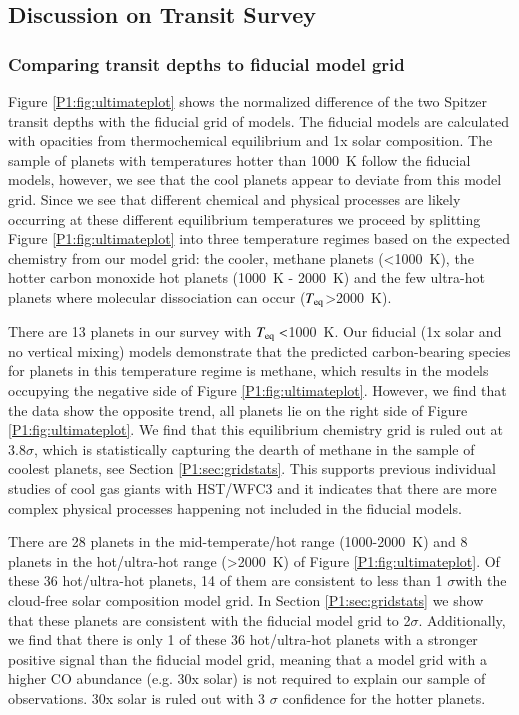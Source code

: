 \subsection{Discussion on Transit Survey}
\subsubsection{Comparing transit depths to fiducial model grid}

Figure \ref{P1:fig:ultimateplot} shows the normalized difference of the two Spitzer transit depths with the fiducial grid of models. The fiducial models are calculated with opacities from thermochemical equilibrium and 1x solar composition. The sample of planets with temperatures hotter than 1000~K follow the fiducial models, however, we see that the cool planets appear to deviate from this model grid. Since we see that different chemical and physical processes are likely occurring at these different equilibrium temperatures we proceed by splitting Figure \ref{P1:fig:ultimateplot} into three temperature regimes based on the expected chemistry from our model grid: the cooler, methane planets (<1000~K), the hotter carbon monoxide hot planets (1000~K - 2000~K) and the few ultra-hot planets where molecular dissociation can occur ($T_{\rm eq}$>2000~K).

There are 13 planets in our survey with $T_{\rm eq}<$1000~K. Our fiducial (1x solar and no vertical mixing) models demonstrate that the predicted carbon-bearing species for planets in this temperature regime is methane, which results in the models occupying the negative side of Figure \ref{P1:fig:ultimateplot}. However, we find that the data show the opposite trend, all planets lie on the right side of Figure \ref{P1:fig:ultimateplot}. We find that this equilibrium chemistry grid is ruled out at 3.8$\sigma$, which is statistically capturing the dearth of methane in the sample of coolest planets, see Section \ref{P1:sec:gridstats}. This supports previous individual studies of cool gas giants with HST/WFC3 and it indicates that there are more complex physical processes happening not included in the fiducial models.

There are 28 planets in the mid-temperate/hot range (1000-2000~K) and 8 planets in the hot/ultra-hot range (>2000~K) of Figure \ref{P1:fig:ultimateplot}. Of these 36 hot/ultra-hot planets, 14 of them are consistent to less than 1 $\sigma$with the cloud-free solar composition model grid. In Section \ref{P1:sec:gridstats} we show that these planets are consistent with the fiducial model grid to 2$\sigma$. Additionally, we find that there is only 1 of these 36 hot/ultra-hot planets with a stronger positive signal than the fiducial model grid, meaning that a model grid with a higher CO abundance (e.g. 30x solar) is not required to explain our sample of observations. 30x solar is ruled out with 3 $\sigma$ confidence for the hotter planets.

